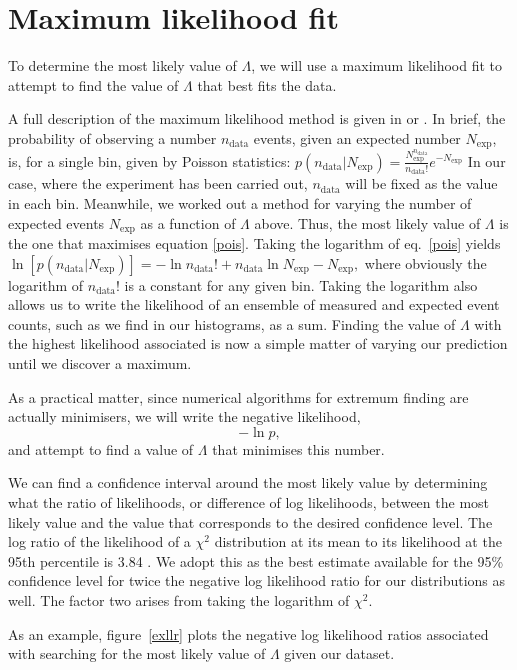 \section{Maximum likelihood fit}
To determine the most likely value of $\Lambda$, we will use a maximum likelihood fit to attempt to find the value of $\Lambda$ that best fits the data.

A full description of the maximum likelihood method is given in \cite{barlow} or \cite{pdg}. In brief, the probability of observing a number $n_\text{data}$ events, given an expected number $N_\text{exp}$, is, for a single bin, given by Poisson statistics:
\(p(n_\text{data}|N_\text{exp})=\frac{N_\text{exp}^{n_\text{data}}}{n_\text{data}!}e^{-N_\text{exp}}\label{pois}\)
In our case, where the experiment has been carried out, $n_\text{data}$ will be fixed as the value in each bin. Meanwhile, we worked out a method for varying the number of expected events $N_\text{exp}$ as a function of $\Lambda$ above. Thus, the most likely value of $\Lambda$ is the one that maximises equation \eqref{pois}. Taking the logarithm of eq.~\eqref{pois} yields
\(\ln[p(n_\text{data}|N_\text{exp})]=-\ln n_\text{data}!+n_\text{data}\ln N_\text{exp}-N_\text{exp},\)
where obviously the logarithm of $n_\text{data}!$ is a constant for any given bin. Taking the logarithm also allows us to write the likelihood of an ensemble of measured and expected event counts, such as we find in our histograms, as a sum. Finding the value of $\Lambda$ with the highest likelihood associated is now a simple matter of varying our prediction until we discover a maximum.

As a practical matter, since numerical algorithms for extremum finding are actually minimisers, we will write the negative likelihood,
\[-\ln p,\]
and attempt to find a value of $\Lambda$ that minimises this number. 

We can find a confidence interval around the most likely value by determining what the ratio of likelihoods, or difference of log likelihoods, between the most likely value and the value that corresponds to the desired confidence level. The log ratio of the likelihood of a $\chi^2$ distribution at its mean to its likelihood at the 95th percentile is 3.84 \cite{pdg}. We adopt this as the best estimate available for the 95\% confidence level for twice the negative log likelihood ratio for our distributions as well. The factor two arises from taking the logarithm of $\chi^2$.

As an example, figure~\ref{exllr} plots the negative log likelihood ratios associated with searching for the most likely value of $\Lambda$ given our dataset.

